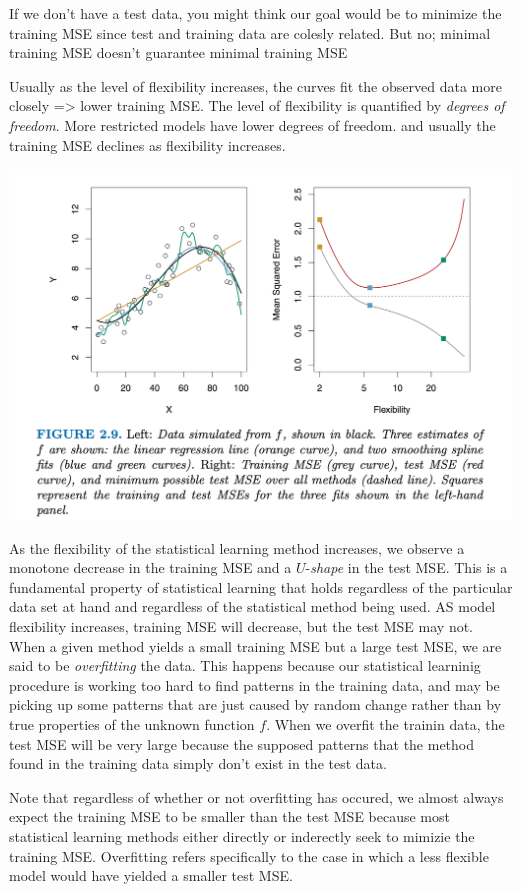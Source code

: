 \documentclass[
  letterpaper,
  DIV=11,
  numbers=noendperiod]{scrreprt}
\begin{document}
If we don't have a test data, you might think our goal would be to
minimize the training MSE since test and training data are colesly
related. But no; minimal training MSE doesn't guarantee minimal training
MSE

Usually as the level of flexibility increases, the curves fit the
observed data more closely =\textgreater{} lower training MSE. The level
of flexibility is quantified by \emph{degrees of freedom}. More
restricted models have lower degrees of freedom. and usually the
training MSE declines as flexibility increases.

\includegraphics{fig2.9.png}

As the flexibility of the statistical learning method increases, we
observe a monotone decrease in the training MSE and a \(U\)-\emph{shape}
in the test MSE. This is a fundamental property of statistical learning
that holds regardless of the particular data set at hand and regardless
of the statistical method being used. AS model flexibility increases,
training MSE will decrease, but the test MSE may not. When a given
method yields a small training MSE but a large test MSE, we are said to
be \emph{overfitting} the data. This happens because our statistical
learninig procedure is working too hard to find patterns in the training
data, and may be picking up some patterns that are just caused by random
change rather than by true properties of the unknown function \(f\).
When we overfit the trainin data, the test MSE will be very large
because the supposed patterns that the method found in the training data
simply don't exist in the test data.

Note that regardless of whether or not overfitting has occured, we
almost always expect the training MSE to be smaller than the test MSE
because most statistical learning methods either directly or inderectly
seek to mimizie the training MSE. Overfitting refers specifically to the
case in which a less flexible model would have yielded a smaller test
MSE.
\end{document}
